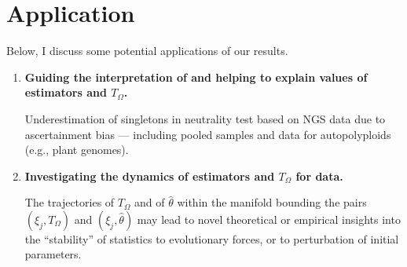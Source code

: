 \documentclass[lettersize, 10pt]{article}
\begin{document}
\section*{Application}
Below, I discuss some potential applications of our results. 
\begin{enumerate}
\item \textbf{Guiding the interpretation of and helping to explain values of estimators and $T_\Omega$.}

Underestimation of singletons in neutrality test based on NGS data due to ascertainment bias --- including pooled samples and data for autopolyploids (e.g., plant genomes).

\item \textbf{Investigating the dynamics of estimators and $T_\Omega$ for data.}

The trajectories of $T_\Omega$ and of $\hat{\theta}$ within the manifold bounding the pairs $(\xi_j,T_\Omega)$ and $(\xi_j,\hat{\theta})$ may lead to novel theoretical or empirical insights into the ``stability'' of statistics to evolutionary forces, or to perturbation of initial parameters.  

\end{enumerate}


\end{document}
